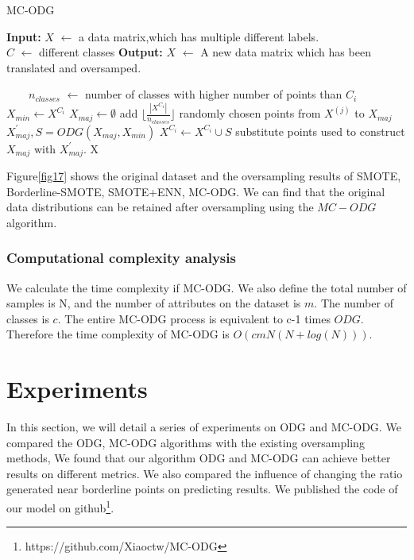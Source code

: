 \documentclass[runningheads]{llncs}
\begin{document}
 \begin{algorithm}[htbp]
  \caption{MC-ODG} %
  \label{alg2}
  \hspace*{0.02in} {\bf Input:} %
   $X$ $\leftarrow$ a data matrix,which has multiple different labels.  \\
   $C$ $\leftarrow$ different classes
  \hspace*{0.02in} {\bf Output:} %
   $X$ $\leftarrow$ A new data matrix which has been translated and oversamped.
  \begin{algorithmic}[1]
   
  　　\State $n_{classes}$ $\leftarrow$ number of classes with higher number of points than $C_i$ 
        \State $X_{min} \leftarrow X^{C_i}$ 
        \State $X_{maj} \leftarrow \emptyset$
            \State add $\lfloor \frac{|X^{C_1}|}{n_{classes}} \rfloor$ randomly chosen points from $X^{(j)}$ to $X_{maj}$
        \EndFor
        \State $X_{maj}^{'},S=ODG(X_{maj},X_{min})$
        \State $X^{C_i} \leftarrow X^{C_i} \cup S$
        \State substitute points used to construct $X_{maj}$ with $X_{maj}^{'}$. 
      \EndIf
  \EndFor
  \State \Return X
  \end{algorithmic}
  \end{algorithm}

 Figure\ref{fig17} shows the original dataset and the oversampling results of SMOTE, Borderline-SMOTE,
 SMOTE+ENN, MC-ODG. We can find that the original data distributions 
 can be retained after oversampling using the $MC-ODG$ algorithm.

 \subsubsection{Computational complexity analysis}
We calculate the time complexity if MC-ODG.
 We also define the total number of samples is N, and the number of attributes on the dataset is $m$.
 The number of classes is $c$. The entire MC-ODG process is equivalent to c-1 times $ODG$.
 Therefore the time complexity of MC-ODG is $O(cmN(N+log(N)))$.

\section{Experiments}
In this section, we will detail a series of experiments on ODG and MC-ODG.
We compared the ODG, MC-ODG algorithms with the existing oversampling methods,
We found that our algorithm ODG and MC-ODG can achieve better results on different metrics.
We also compared the influence of changing the ratio generated near borderline points
on predicting results.
We published the code of our model on github\footnote{https://github.com/Xiaoctw/MC-ODG}.
\end{document}
